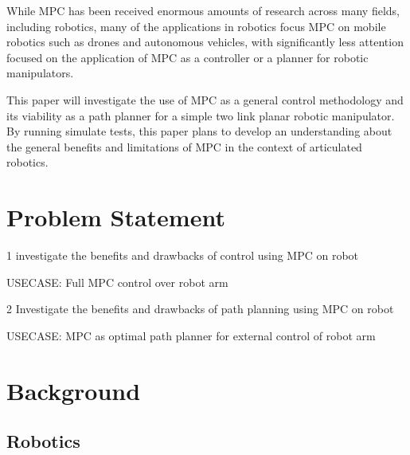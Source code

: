 \documentclass[journal]{IEEEtran}
\begin{document}
While MPC has been received enormous amounts of research across many fields, including  robotics, many of the applications in robotics focus MPC on mobile robotics such as drones and autonomous vehicles, with significantly less attention focused on the application of MPC as a controller or a planner for robotic manipulators.

This paper will investigate the use of MPC as a general control methodology and its viability as a path planner for a simple two link planar robotic manipulator. By running simulate tests, this paper plans to develop an understanding about the general benefits and limitations of MPC in the context of articulated robotics.   


\section{Problem Statement}

1 investigate the benefits and drawbacks of control using MPC on robot

    USECASE: Full MPC control over robot arm

2 Investigate the benefits and drawbacks of path planning using MPC on robot

    USECASE: MPC as optimal path planner for external control of robot arm


\section{Background}

\subsection{Robotics}

\subsubsection{}

\subsubsection{}

\subsubsection{}


\subsection{}
\end{document}
